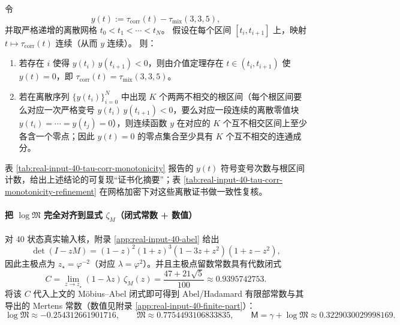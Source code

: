 \begin{remark}\label{prop:chi-slice-sign-change-certificate}
令
\[
y(t):=\tau_{\mathrm{corr}}(t)-\tau_{\mathrm{mix}}(3,3,5),
\]
并取严格递增的离散网格 $t_0<t_1<\cdots<t_N$。
假设在每个区间 $[t_i,t_{i+1}]$ 上，映射 $t\mapsto \tau_{\mathrm{corr}}(t)$ 连续（从而 $y$ 连续）。
则：
\begin{enumerate}
  \item 若存在 $i$ 使得 $y(t_i)\,y(t_{i+1})<0$，则由介值定理存在 $t\in(t_i,t_{i+1})$ 使 $y(t)=0$，即 $\tau_{\mathrm{corr}}(t)=\tau_{\mathrm{mix}}(3,3,5)$。
  \item 若在离散序列 $\{y(t_i)\}_{i=0}^N$ 中出现 $K$ 个两两不相交的根区间（每个根区间要么对应一次严格变号 $y(t_i)\,y(t_{i+1})<0$，要么对应一段连续的离散零值块 $y(t_i)=\cdots=y(t_j)=0$），则连续函数 $y$ 在对应的 $K$ 个互不相交区间上至少各含一个零点；因此 $y(t)=0$ 的零点集合至少具有 $K$ 个互不相交的连通成分。
\end{enumerate}
表 \ref{tab:real-input-40-tau-corr-monotonicity} 报告的 $y(t)$ 符号变号次数与根区间计数，给出上述结论的可复现“证书化摘要”；表 \ref{tab:real-input-40-tau-corr-monotonicity-refinement} 在网格加密下对这些离散证书做一致性复核。
\end{remark}





\paragraph{把 \texorpdfstring{$\log\mathfrak{M}$}{logM} 完全对齐到显式 \texorpdfstring{$\zeta_M$}{zeta\_M}（闭式常数 + 数值）}
对 40 状态真实输入核，附录 \ref{app:real-input-40-abel} 给出
\[
\det(I-zM)=(1-z)^2(1+z)^3(1-3z+z^2)(1+z-z^2),
\]
因此主极点为 $z_\star=\varphi^{-2}$（对应 $\lambda=\varphi^2$）。并且主极点留数常数具有代数闭式
\[
C=\lim_{z\to z_\star}(1-\lambda z)\,\zeta_M(z)=\frac{47+21\sqrt5}{100}\approx 0.9395742753.
\]
将该 $C$ 代入上文的 Möbius--Abel 闭式即可得到 Abel/Hadamard 有限部常数与其导出的 Mertens 常数（数值见附录 \ref{app:real-input-40-finite-part}）：
\[
\log\mathfrak{M}\approx -0.254312661901716,\qquad
\mathfrak{M}\approx 0.7754493106833835,\qquad
\mathsf{M}=\gamma+\log\mathfrak{M}\approx 0.3229030029998169.
\]

